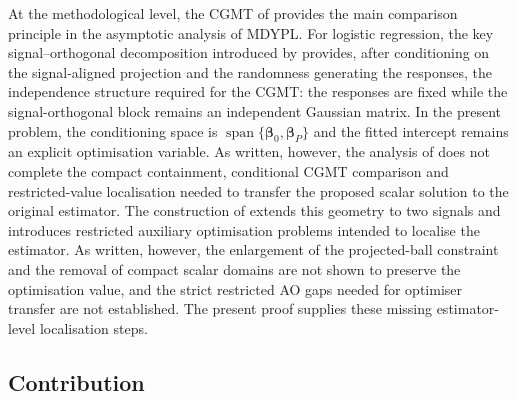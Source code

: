 \documentclass{article}
\theoremstyle{definition}
\newcommand*{\bb}{\boldsymbol}
\def\bbeta{\bb{\beta}}
\newcommand{\vspan}{\operatorname{span}}
\begin{document}
\begin{bibunit}
At the methodological level, the CGMT of
\citet{thrampoulidis+etal:2018} provides the main comparison principle in the asymptotic analysis of MDYPL. 
For logistic regression, the key signal--orthogonal decomposition introduced by \citet{salehi+et+al:2019} provides, 
after conditioning on the signal-aligned projection and the randomness generating the responses, 
the independence structure required for the CGMT: the responses are fixed while the signal-orthogonal 
block remains an independent Gaussian matrix.
In the present problem, the conditioning space is
$\vspan\{\bbeta_0,\bbeta_P\}$ and the fitted intercept remains an explicit
optimisation variable. As written, however, the analysis of
\citet{salehi+et+al:2019} does not complete the compact containment,
conditional CGMT comparison and restricted-value localisation needed to
transfer the proposed scalar solution to the original estimator.
The construction of \citet{li+huang:2024} extends this geometry to two
signals and introduces restricted auxiliary optimisation problems intended
to localise the estimator. As written, however, the enlargement of the
projected-ball constraint and the removal of compact scalar domains are not
shown to preserve the optimisation value, and the strict restricted AO gaps
needed for optimiser transfer are not established. The present proof
supplies these missing estimator-level localisation steps.

\subsection{Contribution}


\end{bibunit}
\end{document}
